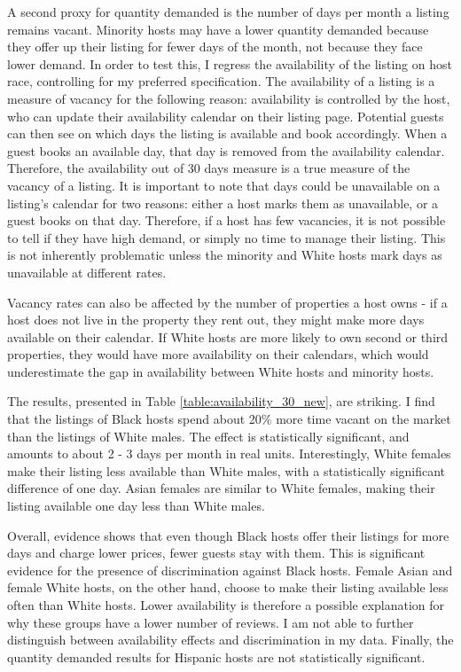 A second proxy for quantity demanded is the number of days per month a listing remains vacant. Minority hosts may have a lower quantity demanded because they offer up their listing for fewer days of the month, not because they face lower demand. In order to test this, I regress the availability of the listing on host race, controlling for my preferred specification. The availability of a listing is a measure of vacancy for the following reason: availability is controlled by the host, who can update their availability calendar on their listing page. Potential guests can then see on which days the listing is available and book accordingly. When a guest books an available day, that day is removed from the availability calendar. Therefore, the availability out of 30 days measure is a true measure of the vacancy of a listing. It is  important to note that days could be unavailable on a listing's calendar for two reasons: either a host marks them as unavailable, or a guest books on that day. Therefore, if a host has few vacancies, it is not possible to tell if they have high demand, or simply no time to manage their listing. This is not inherently problematic unless the minority and White hosts mark days as unavailable at different rates. 

Vacancy rates can also be affected by the number of properties a host owns - if a host does not live in the property they rent out, they might make more days available on their calendar. If White hosts are more likely to own second or third properties, they would have more availability on their calendars, which would underestimate the gap in availability between White hosts and minority hosts.  

The results, presented in Table \ref{table:availability_30_new}, are striking. I find that the listings of Black hosts spend about 20\% more time vacant on the market than the listings of White males. The effect is statistically significant, and amounts to about 2 - 3 days per month in real units. Interestingly, White females make their listing less available than White males, with a statistically significant difference of one day. Asian females are similar to White females, making their listing available one day less than White males. 

Overall, evidence shows that even though Black hosts offer their listings for more days and charge lower prices, fewer guests stay with them. This is significant evidence for the presence of discrimination against Black hosts. Female Asian and female White hosts, on the other hand, choose to make their listing available less often than White hosts. Lower availability is therefore a possible explanation for why these groups have a lower number of reviews. I am not able to further distinguish between availability effects and discrimination in my data. Finally, the quantity demanded results for Hispanic hosts are not statistically significant.














